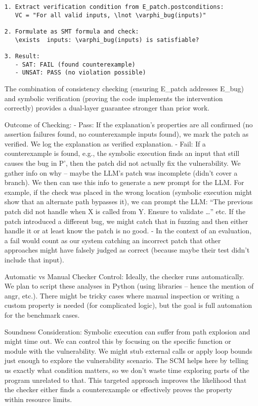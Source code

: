\documentclass[conference,compsoc]{IEEEtran}
\begin{document}
\begin{verbatim}
1. Extract verification condition from E_patch.postconditions:
   VC = "For all valid inputs, \lnot \varphi_bug(inputs)"
   
2. Formulate as SMT formula and check:
   \exists  inputs: \varphi_bug(inputs) is satisfiable?
   
3. Result:
   - SAT: FAIL (found counterexample)
   - UNSAT: PASS (no violation possible)
\end{verbatim}

The combination of consistency checking (ensuring E\_patch addresses
E\_bug) and symbolic verification (proving the code implements the
intervention correctly) provides a dual-layer guarantee stronger than
prior work.

Outcome of Checking: - Pass: If the explanation's properties are all
confirmed (no assertion failures found, no counterexample inputs found),
we mark the patch as verified. We log the explanation as verified
explanation. - Fail: If a counterexample is found, e.g., the symbolic
execution finds an input that still causes the bug in P', then the patch
did not actually fix the vulnerability. We gather info on why -- maybe
the LLM's patch was incomplete (didn't cover a branch). We then can use
this info to generate a new prompt for the LLM. For example, if the
check was placed in the wrong location (symbolic execution might show
that an alternate path bypasses it), we can prompt the LLM: ``The
previous patch did not handle when X is called from Y. Ensure to
validate \ldots'' etc. If the patch introduced a different bug, we might
catch that in fuzzing and then either handle it or at least know the
patch is no good. - In the context of an evaluation, a fail would count
as our system catching an incorrect patch that other approaches might
have falsely judged as correct (because maybe their test didn't include
that input).

Automatic vs Manual Checker Control: Ideally, the checker runs
automatically. We plan to script these analyses in Python (using
libraries -- hence the mention of angr, etc.). There might be tricky
cases where manual inspection or writing a custom property is needed
(for complicated logic), but the goal is full automation for the
benchmark cases.

Soundness Consideration: Symbolic execution can suffer from path
explosion and might time out. We can control this by focusing on the
specific function or module with the vulnerability. We might stub
external calls or apply loop bounds just enough to explore the
vulnerability scenario. The SCM helps here by telling us exactly what
condition matters, so we don't waste time exploring parts of the program
unrelated to that. This targeted approach improves the likelihood that
the checker either finds a counterexample or effectively proves the
property within resource limits.
\end{document}

